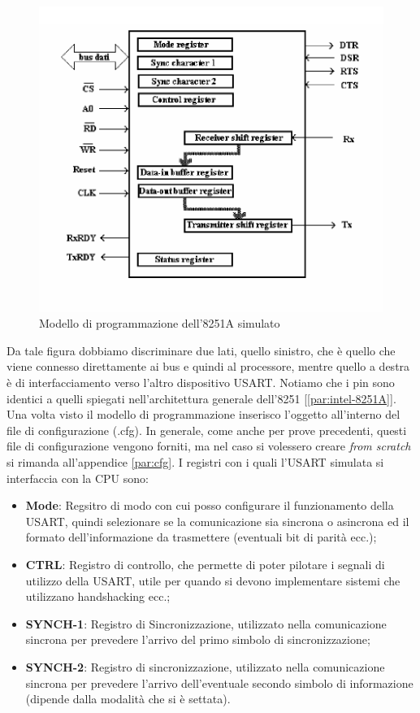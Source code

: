 \begin{figure}[ht]
    \centering
    \includegraphics[width=.5\textwidth]{img/prog-8251A.png}
    \caption{Modello di programmazione dell'8251A simulato}\label{img:prog-8251A}
\end{figure}

Da tale figura dobbiamo discriminare due lati, quello sinistro, che è quello che viene connesso direttamente ai bus e quindi al processore, mentre quello a destra è di interfacciamento verso l'altro dispositivo USART.
Notiamo che i pin sono identici a quelli spiegati nell'architettura generale dell'8251 [\ref{par:intel-8251A}].
Una volta visto il modello di programmazione inserisco l'oggetto all'interno del file di configurazione (.cfg). In generale, come anche per prove precedenti, questi file di configurazione vengono forniti, ma nel caso si volessero creare \textit{from scratch} si rimanda all'appendice \ref{par:cfg}.
I registri con i quali l'USART simulata si interfaccia con la CPU sono:
\begin{itemize}
    \item \textbf{Mode}: Regsitro di modo con cui posso configurare il funzionamento della USART, quindi selezionare se la comunicazione sia sincrona o asincrona ed il formato dell'informazione da trasmettere (eventuali bit di parità ecc.);
    \item \textbf{CTRL}: Registro di controllo, che permette di poter pilotare i segnali di utilizzo della USART, utile per quando si devono implementare sistemi che utilizzano handshacking ecc.;
    \item \textbf{SYNCH-1}: Registro di Sincronizzazione, utilizzato nella comunicazione sincrona per prevedere l'arrivo del primo simbolo di sincronizzazione;
    \item \textbf{SYNCH-2}: Registro di sincronizzazione, utilizzato nella comunicazione sincrona per prevedere l'arrivo dell'eventuale secondo simbolo di informazione (dipende dalla modalità che si è settata).
\end{itemize}

